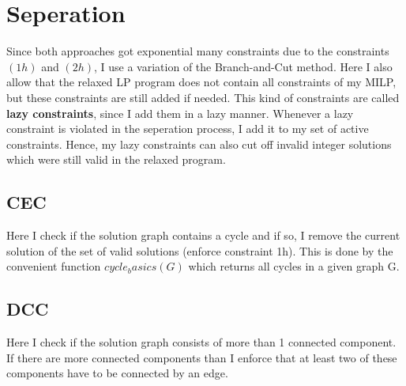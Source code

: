 \documentclass[11pt]{article}
\begin{document}
\section{Seperation}
Since both approaches got exponential many constraints due to the constraints $(1h)$ and $(2h)$, I use a variation of the Branch-and-Cut method. Here I also allow that the relaxed LP program does not contain all constraints of my MILP, but these constraints are still added if needed. This kind of constraints are called \textbf{lazy constraints}, since I add them in a lazy manner. Whenever a lazy constraint is violated in the seperation process, I add it to my set of active constraints. Hence, my lazy constraints can also cut off invalid integer solutions which were still valid in the relaxed program.
 
\subsection{CEC}
Here I check if the solution graph contains a cycle and if so, I remove the current solution of the set of valid solutions (enforce constraint 1h). This is done by the convenient function $cycle_basics(G)$ which returns all cycles in a given graph G.
\subsection{DCC}
Here I check if the solution graph consists of more than 1 connected component. If there are more connected components than I enforce that at least two of these components have to be connected by an edge.
\end{document}
